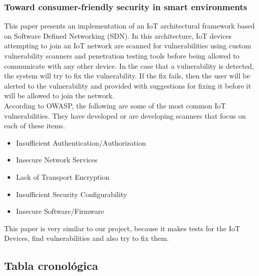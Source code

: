\subsubsection{Toward consumer-friendly security in smart environments}\cite{Paper7}
This paper presents an implementation of an IoT architectural framework based on Software Defined Networking (SDN). In this architecture, IoT devices attempting to join an IoT network are scanned for vulnerabilities using custom vulnerability scanners and penetration testing tools before being allowed to communicate with any other device. In the case that a vulnerability is detected, the system will try to fix the vulnerability. If the fix fails, then the user will be alerted to the vulnerability and provided with suggestions for fixing it before it will be allowed to join the network.\\
According to OWASP, the following are some of the most common IoT vulnerabilities. They have developed or are developing scanners that focus on each of these items.
\begin{itemize}
	\item Insufficient Authentication/Authorization
	\item Insecure Network Services
	\item Lack of Transport Encryption
	\item Insufficient  Security  Configurability
	\item Insecure Software/Firmware
\end{itemize}
This paper is very similar to our project, because it makes tests for the IoT Devices, find vulnerabilities and also try to fix them.

\newpage
\subsection{Tabla cronológica}

